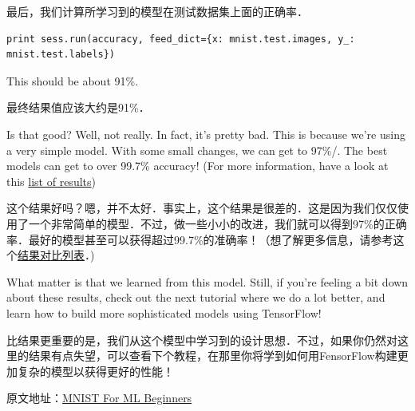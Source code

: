 最后，我们计算所学习到的模型在测试数据集上面的正确率．

\begin{lstlisting}
print sess.run(accuracy, feed_dict={x: mnist.test.images, y_: mnist.test.labels})
\end{lstlisting}

This should be about 91\%.

最终结果值应该大约是91\%．

Is that good? Well, not really. In fact, it's pretty bad. This is because we're using a very simple model. With some small changes, we can get to 97\%/. The best models can get to over 99.7\% accuracy! (For more information, have a look at this \href{http://rodrigob.github.io/are_we_there_yet/build/classification_datasets_results.html}{list of results})

这个结果好吗？嗯，并不太好．事实上，这个结果是很差的．这是因为我们仅仅使用了一个非常简单的模型．不过，做一些小小的改进，我们就可以得到97\%的正确率．最好的模型甚至可以获得超过99.7\%的准确率！（想了解更多信息，请参考这个\href{http://rodrigob.github.io/are_we_there_yet/build/classification_datasets_results.html}{结果对比列表}．)

What matter is that we learned from this model. Still, if you're feeling a bit down about these results, check out the next tutorial where we do a lot better, and learn how to build more sophisticated models using TensorFlow!

比结果更重要的是，我们从这个模型中学习到的设计思想．不过，如果你仍然对这里的结果有点失望，可以查看下个教程，在那里你将学到如何用FensorFlow构建更加复杂的模型以获得更好的性能！

原文地址：\href{http://tensorflow.org/tutorials/mnist/beginners/index.md}{MNIST For ML Beginners}
